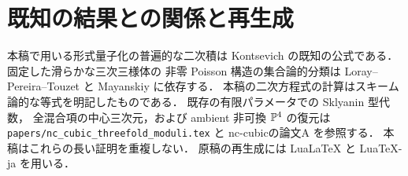 \section{既知の結果との関係と再生成}
本稿で用いる形式量子化の普遍的な二次積は
Kontsevich の既知の公式である．固定した滑らかな三次三様体の
非零 Poisson 構造の集合論的分類は
Loray--Pereira--Touzet と Mayanskiy に依存する．
本稿の二次方程式の計算はスキーム論的な等式を明記したものである．
既存の有限パラメータでの Sklyanin 型代数，
全混合項の中心三次元，および ambient 非可換 $\mathbb P^4$ の復元は
\texttt{papers/nc\_cubic\_threefold\_moduli.tex} と
nc-cubicの論文A を参照する．
本稿はこれらの長い証明を重複しない．
原稿の再生成には LuaLaTeX と LuaTeX-ja を用いる．

